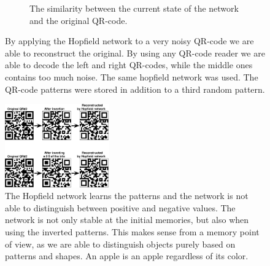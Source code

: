 \begin{figure}[H]
\begin{subfigure}{0.49\textwidth}
        \caption{The similarity between the current state of the network and the original QR-code.}
    \end{subfigure}
    \caption{By applying the Hopfield network to a very noisy QR-code we are able to reconstruct the original. By using any QR-code reader we are able to decode the left and right QR-codes, while the middle ones contains too much noise. The same hopfield network was used. The QR-code patterns were stored in addition to a third random pattern. }
\end{figure}

\begin{figure}[H]
    \centering
        \includegraphics[width=0.4\textwidth]{figs/qr-inverted}
        \caption{The Hopfield network learns the patterns and the network is not able to distinguish between positive and negative values. The network is not only stable at the initial memories, but also when using the inverted patterns. This makes sense from a memory point of view, as we are able to distinguish objects purely based on patterns and shapes. An apple is an apple regardless of its color.}
\end{figure}